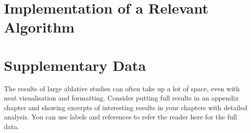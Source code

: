 \chapter{Implementation of a Relevant Algorithm}
\label{app:implementation_algorithm}




\chapter{Supplementary Data}
\label{app:supplementary_data}

The results of large ablative studies can often take up a lot of space, even with neat visualisation and formatting.
Consider putting full results in an appendix chapter and showing excerpts of interesting results in your chapters with detailed analysis.
You can use labels and references to refer the reader here for the full data.
